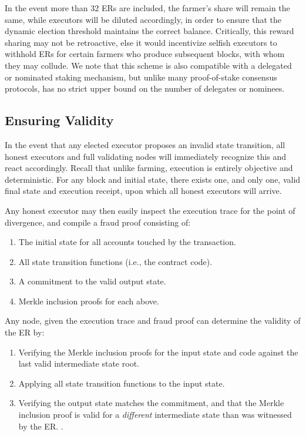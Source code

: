 \documentclass[conference]{IEEEtran}
\begin{document}
In the event more than 32 ERs are included, the farmer’s share will remain the same, while executors will be diluted accordingly, in order to ensure that the dynamic election threshold maintains the correct balance. Critically, this reward sharing may not be retroactive, else it would incentivize selfish executors to withhold ERs for certain farmers who produce subsequent blocks, with whom they may collude. We note that this scheme is also compatible with a delegated or nominated staking mechanism, but unlike many proof-of-stake consensus protocols, has no strict upper bound on the number of delegates or nominees.

\subsection{Ensuring Validity}

In the event that any elected executor proposes an invalid state transition, all honest executors and full validating nodes will immediately recognize this and react accordingly. Recall that unlike farming, execution is entirely objective and deterministic. For any block and initial state, there exists one, and only one, valid final state and execution receipt, upon which all honest executors will arrive. 

Any honest executor may then easily inspect the execution trace for the point of divergence, and compile a fraud proof consisting of:

\begin{enumerate}
    \item The initial state for all accounts touched by the transaction.
    \item All state transition functions (i.e., the contract code).
    \item A commitment to the valid output state.
    \item Merkle inclusion proofs for each above.
\end{enumerate}

Any node, given the execution trace and fraud proof can determine the validity of the ER by:

\begin{enumerate}
    \item Verifying the Merkle inclusion proofs for the input state and code against the last valid intermediate state root.
    \item Applying all state transition functions to the input state.
    \item Verifying the output state matches the commitment, and that the Merkle inclusion proof is valid for a \textit{different} intermediate state than was witnessed by the ER. .
\end{enumerate}
\end{document}
